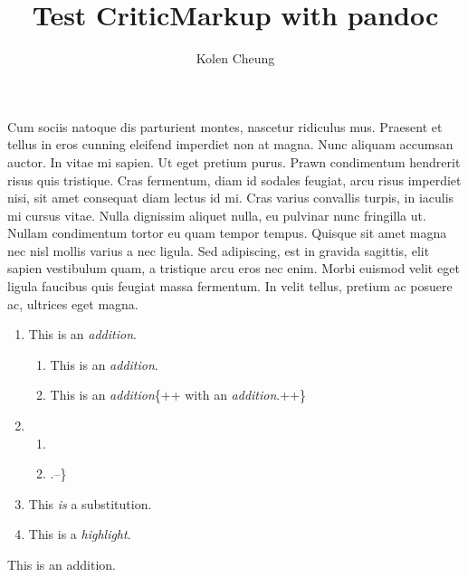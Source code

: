 \documentclass[]{article}
\title{Test CriticMarkup with pandoc}
\author{Kolen Cheung}
\date{}
\providecommand{\tightlist}{%
  \setlength{\itemsep}{0pt}\setlength{\parskip}{0pt}}
\begin{document}
\maketitle

Cum sociis natoque dis parturient montes, nascetur ridiculus mus.
Praesent et tellus in eros cunning eleifend imperdiet non at magna. Nunc
aliquam accumsan auctor. In vitae mi sapien. Ut eget pretium purus.
Prawn condimentum hendrerit risus quis tristique. Cras fermentum, diam
id sodales feugiat, arcu risus imperdiet nisi, sit amet consequat diam
lectus id mi. Cras varius convallis turpis, in iaculis mi cursus vitae.
Nulla dignissim aliquet nulla, eu pulvinar nunc fringilla ut. Nullam
condimentum tortor eu quam tempor tempus. Quisque sit amet magna nec
nisl mollis varius a nec ligula. Sed adipiscing, est in gravida
sagittis, elit sapien vestibulum quam, a tristique arcu eros nec enim.
Morbi euismod velit eget ligula faucibus quis feugiat massa fermentum.
In velit tellus, pretium ac posuere ac, ultrices eget magna.

\begin{enumerate}
\def\labelenumi{\arabic{enumi}.}
\item
  This is an \emph{addition}.

  \begin{enumerate}
  \def\labelenumii{\arabic{enumii}.}
  \tightlist
  \item
    This is an \emph{addition}.
  \item
    This is an \emph{addition}\{++ with an \emph{addition}.++\}
  \end{enumerate}
\item
  \begin{enumerate}
  \def\labelenumii{\arabic{enumii}.}
  \item
  \item
    .--\}
  \end{enumerate}
\item
  This \emph{is} a substitution.
\item
  This is a \emph{highlight}.
\end{enumerate}

This is an addition.
\end{document}
